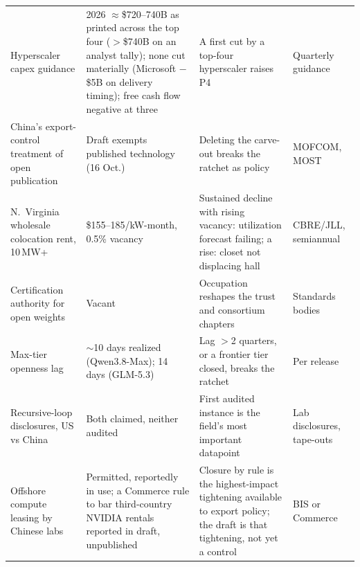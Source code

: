 {\begin{longtable}{@{}p{38mm}p{30mm}p{55mm}p{23mm}@{}}
Hyperscaler capex guidance & 2026 $\approx$\$720--740B as printed across the top four ($>$\$740B on an analyst tally); none cut materially (Microsoft $-$\$5B on delivery timing); free cash flow negative at three & A first cut by a top-four hyperscaler raises P4 & Quarterly guidance \\
China's export-control treatment of open publication & Draft exempts published technology (16 Oct.) & Deleting the carve-out breaks the ratchet as policy & MOFCOM, MOST \\
N.~Virginia wholesale colocation rent, 10\,MW+ & \$155--185/kW-month, 0.5\% vacancy & Sustained decline with rising vacancy: utilization forecast failing; a rise: closet not displacing hall & CBRE/JLL, semiannual \\
Certification authority for open weights & Vacant & Occupation reshapes the trust and consortium chapters & Standards bodies \\
Max-tier openness lag & $\sim$10 days realized (Qwen3.8-Max); 14 days (GLM-5.3) & Lag $>$2 quarters, or a frontier tier closed, breaks the ratchet & Per release \\
Recursive-loop disclosures, US vs China & Both claimed, neither audited & First audited instance is the field's most important datapoint & Lab disclosures, tape-outs \\
Offshore compute leasing by Chinese labs & Permitted, reportedly in use; a Commerce rule to bar third-country NVIDIA rentals reported in draft, unpublished & Closure by rule is the highest-impact tightening available to export policy; the draft is that tightening, not yet a control & BIS or Commerce \\
\end{longtable}
}
